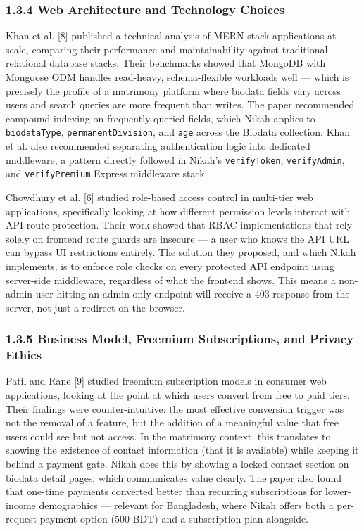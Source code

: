 \documentclass[conference]{IEEEtran}
\begin{document}
\subsubsection*{1.3.4 Web Architecture and Technology Choices}
Khan et al. [8] published a technical analysis of MERN stack applications at scale, comparing their performance and maintainability against traditional relational database stacks. Their benchmarks showed that MongoDB with Mongoose ODM handles read-heavy, schema-flexible workloads well --- which is precisely the profile of a matrimony platform where biodata fields vary across users and search queries are more frequent than writes. The paper recommended compound indexing on frequently queried fields, which Nikah applies to \texttt{biodataType}, \texttt{permanentDivision}, and \texttt{age} across the Biodata collection. Khan et al. also recommended separating authentication logic into dedicated middleware, a pattern directly followed in Nikah's \texttt{verifyToken}, \texttt{verifyAdmin}, and \texttt{verifyPremium} Express middleware stack.

Chowdhury et al. [6] studied role-based access control in multi-tier web applications, specifically looking at how different permission levels interact with API route protection. Their work showed that RBAC implementations that rely solely on frontend route guards are insecure --- a user who knows the API URL can bypass UI restrictions entirely. The solution they proposed, and which Nikah implements, is to enforce role checks on every protected API endpoint using server-side middleware, regardless of what the frontend shows. This means a non-admin user hitting an admin-only endpoint will receive a 403 response from the server, not just a redirect on the browser.

\subsubsection*{1.3.5 Business Model, Freemium Subscriptions, and Privacy Ethics}
Patil and Rane [9] studied freemium subscription models in consumer web applications, looking at the point at which users convert from free to paid tiers. Their findings were counter-intuitive: the most effective conversion trigger was not the removal of a feature, but the addition of a meaningful value that free users could see but not access. In the matrimony context, this translates to showing the existence of contact information (that it is available) while keeping it behind a payment gate. Nikah does this by showing a locked contact section on biodata detail pages, which communicates value clearly. The paper also found that one-time payments converted better than recurring subscriptions for lower-income demographics --- relevant for Bangladesh, where Nikah offers both a per-request payment option (500 BDT) and a subscription plan alongside.
\end{document}

